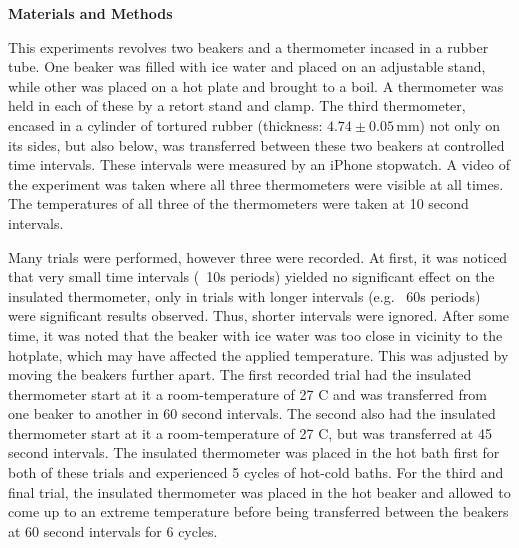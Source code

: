\documentclass[11pt]{article}
\begin{document}
\begin{multicols}{2}
    \vspace{20pt}

     \selectfont \textbf{Materials and Methods}
    
     \selectfont 


    This experiments revolves two beakers and a thermometer incased in a rubber tube. One beaker was filled with ice water and placed on an adjustable stand, while other was placed on a hot plate and brought to a boil. A thermometer was held in each of these by a retort stand and clamp. The third thermometer, encased in a cylinder of tortured rubber (thickness: $4.74\pm 0.05\, $mm) not only on its sides, but also below, was transferred between these two beakers at controlled time intervals.  These intervals were measured by an iPhone stopwatch. A video of the experiment was taken where all three thermometers were visible at all times. The temperatures of all three of the thermometers were taken at 10 second intervals.
    
    Many trials were performed, however three were recorded. At first, it was noticed that very small time intervals (~10s periods) yielded no significant effect on the insulated thermometer, only in trials with longer intervals (e.g. ~60s periods) were significant results observed. Thus, shorter intervals were ignored. After some time, it was noted that the beaker with ice water was too close in vicinity to the hotplate, which may have affected the applied temperature. This was adjusted by moving the beakers further apart. The first recorded trial had the insulated thermometer start at it a room-temperature of 27 \textdegree C and was transferred from one beaker to another in 60 second intervals. The second also had the insulated thermometer start at it a room-temperature of 27 \textdegree C, but was transferred at 45 second intervals. The insulated thermometer was placed in the hot bath first for both of these trials and experienced 5 cycles of hot-cold baths. For the third and final trial, the insulated thermometer was placed in the hot beaker and allowed to come up to an extreme temperature before being transferred between the beakers at 60 second intervals for 6 cycles.


\end{multicols}
\end{document}
